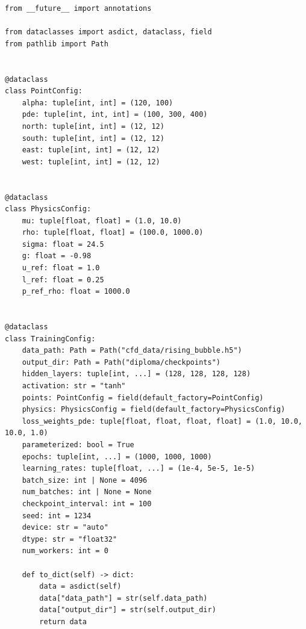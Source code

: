 \bigskip
{}
\nopagebreak
\begin{lstlisting}
from __future__ import annotations

from dataclasses import asdict, dataclass, field
from pathlib import Path


@dataclass
class PointConfig:
    alpha: tuple[int, int] = (120, 100)
    pde: tuple[int, int, int] = (100, 300, 400)
    north: tuple[int, int] = (12, 12)
    south: tuple[int, int] = (12, 12)
    east: tuple[int, int] = (12, 12)
    west: tuple[int, int] = (12, 12)


@dataclass
class PhysicsConfig:
    mu: tuple[float, float] = (1.0, 10.0)
    rho: tuple[float, float] = (100.0, 1000.0)
    sigma: float = 24.5
    g: float = -0.98
    u_ref: float = 1.0
    l_ref: float = 0.25
    p_ref_rho: float = 1000.0


@dataclass
class TrainingConfig:
    data_path: Path = Path("cfd_data/rising_bubble.h5")
    output_dir: Path = Path("diploma/checkpoints")
    hidden_layers: tuple[int, ...] = (128, 128, 128, 128)
    activation: str = "tanh"
    points: PointConfig = field(default_factory=PointConfig)
    physics: PhysicsConfig = field(default_factory=PhysicsConfig)
    loss_weights_pde: tuple[float, float, float, float] = (1.0, 10.0, 10.0, 1.0)
    parameterized: bool = True
    epochs: tuple[int, ...] = (1000, 1000, 1000)
    learning_rates: tuple[float, ...] = (1e-4, 5e-5, 1e-5)
    batch_size: int | None = 4096
    num_batches: int | None = None
    checkpoint_interval: int = 100
    seed: int = 1234
    device: str = "auto"
    dtype: str = "float32"
    num_workers: int = 0

    def to_dict(self) -> dict:
        data = asdict(self)
        data["data_path"] = str(self.data_path)
        data["output_dir"] = str(self.output_dir)
        return data



\end{lstlisting}
